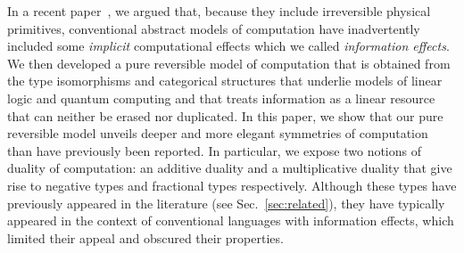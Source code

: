 \documentclass[preprint]{sigplanconf}
\begin{document}
In a recent paper~\cite{infeffects}, we argued that, because they include
irreversible physical primitives, conventional abstract models of computation
have inadvertently included some \emph{implicit} computational effects which
we called \emph{information effects}. We then developed a pure reversible
model of computation that is obtained from the type isomorphisms and
categorical structures that underlie models of linear logic and quantum
computing and that treats information as a linear resource that can neither
be erased nor duplicated. In this paper, we show that our pure reversible
model unveils deeper and more elegant symmetries of computation than have
previously been reported. In particular, we expose two notions of duality of
computation: an additive duality and a multiplicative duality that give rise
to negative types and fractional types respectively. Although these types
have previously appeared in the literature (see Sec.~\ref{sec:related}), they
have typically appeared in the context of conventional languages with
information effects, which limited their appeal and obscured their properties.
\end{document}
